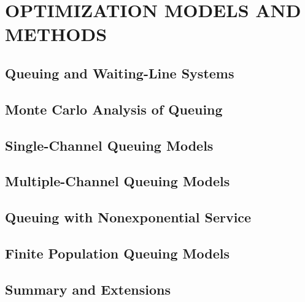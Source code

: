 \chapter{OPTIMIZATION MODELS AND METHODS}\label{chap:13}

\section{Queuing and Waiting-Line Systems}


\section{Monte Carlo Analysis of Queuing}


\section{Single-Channel Queuing Models}


\section{Multiple-Channel Queuing Models}


\section{Queuing with Nonexponential Service}


\section{Finite Population Queuing Models}


\section{Summary and Extensions}

